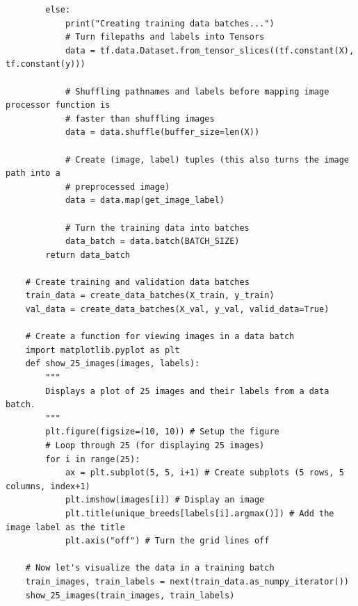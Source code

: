 \documentclass[11pt, a4paper]{article}
\begin{document}
\begin{spacing}{1.1}
\begin{lstlisting}
		else:
			print("Creating training data batches...")
			# Turn filepaths and labels into Tensors
			data = tf.data.Dataset.from_tensor_slices((tf.constant(X), tf.constant(y)))
			
			# Shuffling pathnames and labels before mapping image processor function is 
			# faster than shuffling images
			data = data.shuffle(buffer_size=len(X))
		
			# Create (image, label) tuples (this also turns the image path into a 
			# preprocessed image)
			data = data.map(get_image_label)
			
			# Turn the training data into batches
			data_batch = data.batch(BATCH_SIZE)
		return data_batch 
		
	# Create training and validation data batches
	train_data = create_data_batches(X_train, y_train)
	val_data = create_data_batches(X_val, y_val, valid_data=True) 
	
	# Create a function for viewing images in a data batch
	import matplotlib.pyplot as plt
	def show_25_images(images, labels):
		"""
		Displays a plot of 25 images and their labels from a data batch.
		"""
		plt.figure(figsize=(10, 10)) # Setup the figure
		# Loop through 25 (for displaying 25 images)
		for i in range(25):
			ax = plt.subplot(5, 5, i+1) # Create subplots (5 rows, 5 columns, index+1)
			plt.imshow(images[i]) # Display an image 
			plt.title(unique_breeds[labels[i].argmax()]) # Add the image label as the title
			plt.axis("off") # Turn the grid lines off 
	
	# Now let's visualize the data in a training batch
	train_images, train_labels = next(train_data.as_numpy_iterator())
	show_25_images(train_images, train_labels) \end{lstlisting} \newpage


\end{spacing}
\end{document}
